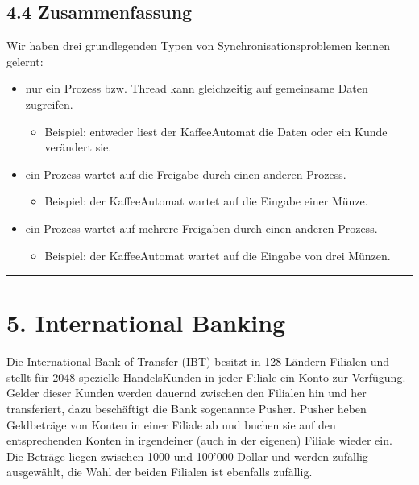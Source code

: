 \documentclass[a4paper,10pt,english]{report}
\begin{document}
\subsection{4.4	Zusammenfassung}
\label{\detokenize{P08_Sync/README:zusammenfassung}}
\sphinxAtStartPar
Wir haben drei grundlegenden Typen von Synchronisationsproblemen kennen gelernt:
\begin{itemize}
\item {} 
\sphinxAtStartPar
{} nur ein Prozess bzw. Thread kann gleichzeitig auf gemeinsame Daten zugreifen.
\begin{itemize}
\item {} 
\sphinxAtStartPar
Beispiel: entweder liest der Kaffee\sphinxhyphen{}Automat die Daten oder ein Kunde verändert sie.

\end{itemize}

\item {} 
\sphinxAtStartPar
{} ein Prozess wartet auf die Freigabe durch einen anderen Prozess.
\begin{itemize}
\item {} 
\sphinxAtStartPar
Beispiel: der Kaffee\sphinxhyphen{}Automat wartet auf die Eingabe einer Münze.

\end{itemize}

\item {} 
\sphinxAtStartPar
{} ein Prozess wartet auf mehrere Freigaben durch einen anderen Pro\sphinxhyphen{}zess.
\begin{itemize}
\item {} 
\sphinxAtStartPar
Beispiel: der Kaffee\sphinxhyphen{}Automat wartet auf die Eingabe von drei Münzen.

\end{itemize}

\end{itemize}


\bigskip\hrule\bigskip



\section{5. International Banking}
\label{\detokenize{P08_Sync/README:international-banking}}
\sphinxAtStartPar
Die International Bank of Transfer (IBT) besitzt in 128 Ländern Filialen und stellt für 2048 spezielle Handels\sphinxhyphen{}Kunden in jeder Filiale ein Konto zur Verfügung. Gelder dieser Kunden werden dauernd zwischen den Filialen hin und her transferiert, dazu beschäftigt die Bank sogenannte Pusher. Pusher heben Geldbeträge von Konten in einer Filiale ab und buchen sie auf den entsprechenden Konten in irgendeiner (auch in der eigenen) Filiale wieder ein. Die Beträge liegen zwischen 1000 und 100’000 Dollar und werden zufällig ausgewählt, die Wahl der beiden Filialen ist ebenfalls zufällig.
\end{document}
